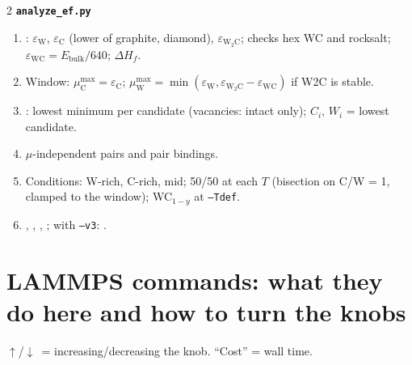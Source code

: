 \documentclass[10pt]{article}
\newcommand{\cmd}[1]{\texttt{\small #1}}
\newcommand{\up}{\textcolor{org}{$\uparrow$}}
\newcommand{\dn}{\textcolor{acc}{$\downarrow$}}
\newcommand{\sect}[1]{\Needspace{12\baselineskip}\section{#1}}
\begin{document}
\begin{multicols}{2}
\textbf{\cmd{analyze\_ef.py}}
\begin{enumerate}
\item {}: $\varepsilon_\mathrm W$, $\varepsilon_\mathrm C$ (lower of graphite, diamond), $\varepsilon_\mathrm{W_2C}$; checks hex WC and rocksalt; $\varepsilon_\mathrm{WC} = E_\mathrm{bulk}/640$; $\Delta H_f$.
\item Window: $\mu_\mathrm C^\mathrm{max} = \varepsilon_\mathrm C$; $\mu_\mathrm W^\mathrm{max} = \min(\varepsilon_\mathrm W, \varepsilon_\mathrm{W_2C}-\varepsilon_\mathrm{WC})$ if W2C is stable.
\item {}: lowest minimum per candidate (vacancies: intact only); $C_i$, $W_i$ = lowest candidate.
\item $\mu$-independent pairs and pair bindings.
\item Conditions: W-rich, C-rich, mid; 50/50 at each $T$ (bisection on C/W = 1, clamped to the window); WC$_{1-y}$ at \cmd{--Tdef}.
\item {}, , , ; with \cmd{--v3}: .
\end{enumerate}
\end{multicols}

\sect{LAMMPS commands: what they do here and how to turn the knobs}
\up/\dn\ = increasing/decreasing the knob. ``Cost'' = wall time.
\end{document}
